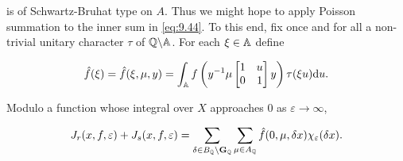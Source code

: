 is of Schwartz-Bruhat type on $A$. Thus we might hope to apply Poisson summation to the inner sum in \eqref{eq:9.44}. To this end, fix once and for all a non-trivial unitary character $\tau$ of $\mathbb{Q} \backslash \mathbb{A}$. For each $\xi \in \mathbb{A}$ define

\[
\hat{f}(\xi) = \hat{f}(\xi, \mu, y) = \int_{\mathbb{A}} f\left(y^{-1}\mu\begin{bmatrix} 1 & u \\ 0 & 1 \end{bmatrix}y\right)\tau(\xi u)\mathrm{d} u.
\]

\begin{lemma}\label{lem:9.13}

Modulo a function whose integral over $X$ approaches 0 as $\varepsilon \to \infty$,

\[
J_r(x, f, \varepsilon) + J_s(x, f, \varepsilon) = \sum_{\delta \in B_{\mathbb{Q}} \setminus \mathbf{G}_{\mathbb{Q}}}\sum_{\mu \in A_{\mathbb{Q}}} \hat{f}(0, \mu, \delta x)\chi_\varepsilon(\delta x).
\]

\end{lemma}

